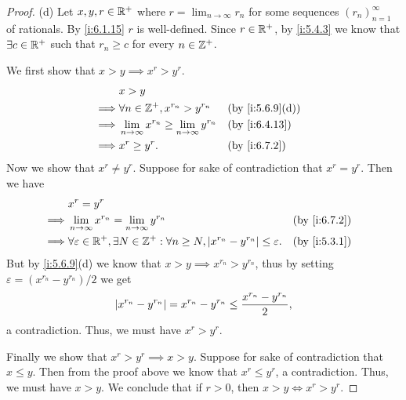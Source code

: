 \begin{proof}{(d)}
  Let \(x, y, r \in \mathbb{R}^+\) where \(r = \lim_{n \to \infty} r_n\) for some sequences \((r_n)_{n = 1}^\infty\) of rationals.
  By \cref{i:6.1.15} \(r\) is well-defined.
  Since \(r \in \mathbb{R}^+\), by \cref{i:5.4.3} we know that \(\exists c \in \mathbb{R}^+\) such that \(r_n \geq c\) for every \(n \in \mathbb{Z}^+\).

  We first show that \(x > y \implies x^r > y^r\).
  \begin{align*}
             & x > y                                                                             \\
    \implies & \forall n \in \Z^+, x^{r_n} > y^{r_n}                        &  & \by{i:5.6.9}[d] \\
    \implies & \lim_{n \to \infty} x^{r_n} \geq \lim_{n \to \infty} y^{r_n} &  & \by{i:6.4.13}   \\
    \implies & x^r \geq y^r.                                                &  & \by{i:6.7.2}
  \end{align*}
  Now we show that \(x^r \neq y^r\).
  Suppose for sake of contradiction that \(x^r = y^r\).
  Then we have
  \begin{align*}
             & x^r = y^r                                                                                                                        \\
    \implies & \lim_{n \to \infty} x^{r_n} = \lim_{n \to \infty} y^{r_n}                                                      &  & \by{i:6.7.2} \\
    \implies & \forall \varepsilon \in \R^+, \exists N \in \Z^+ : \forall n \geq N, \abs{x^{r_n} - y^{r_n}} \leq \varepsilon. &  & \by{i:5.3.1}
  \end{align*}
  But by \cref{i:5.6.9}(d) we know that \(x > y \implies x^{r_n} > y^{r_n}\), thus by setting \(\varepsilon = (x^{r_n} - y^{r_n}) / 2\) we get
  \[
    \left\lvert x^{r_n} - y^{r_n}\right\rvert = x^{r_n} - y^{r_n} \leq \dfrac{x^{r_n} - y^{r_n}}{2},
  \]
  a contradiction.
  Thus, we must have \(x^r > y^r\).

  Finally we show that \(x^r > y^r \implies x > y\).
  Suppose for sake of contradiction that \(x \leq y\).
  Then from the proof above we know that \(x^r \leq y^r\), a contradiction.
  Thus, we must have \(x > y\).
  We conclude that if \(r > 0\), then \(x > y \iff x^r > y^r\).
\end{proof}

